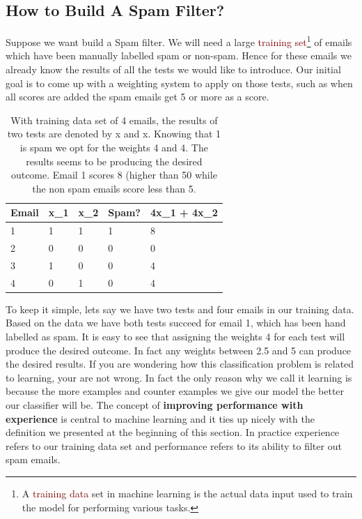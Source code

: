 \documentclass{tufte-handout}
\newcommand{\hlred}[1]{\textcolor{Maroon}{#1}}%
\begin{document}
\subsection{How to Build A Spam Filter?}
Suppose we want build a Spam filter. We will need a large \hlred{training set}\footnote{A \hlred{training data} set in machine learning is the actual data input used to train the model for performing various tasks. } of emails which have been manually labelled spam or non-spam. Hence for these emails we already know the results of all the tests we would like to introduce. Our initial goal  is to come up with a weighting system to apply on those tests, such as when all scores are added the spam emails get 5 or more as a score. 
\begin{table}[ht]
  \centering
  \selectfont
  \begin{tabular}{lllll}
    \toprule
    Email & x_{1} & x_{2} & Spam? & 4x_{1} + 4x_{2}\\
    \midrule
    1 & 1 & 1 & 1 & 8 \\
    2 & 0 & 0 & 0 & 0 \\
    3 & 1 & 0 & 0 & 4 \\
    4 & 0 & 1 & 0 & 4 \\

    \bottomrule
  \end{tabular}
  
  \caption{With training data set of 4 emails, the results of two tests are denoted by x and x. Knowing that 1 is spam we opt for the weights 4 and 4. The results seems to be producing the desired outcome. Email 1 scores 8 (higher than 50 while the non spam emails score less than 5.}
  \label{tab:normaltab}
\end{table}
To keep it simple, lets say we have two tests and four emails in our training data. Based on the data we have both tests succeed for email 1, which has been hand labelled as spam. It is easy to see that assigning the weights 4 for each test will produce the desired outcome. In fact any weights between 2.5 and 5 can produce the desired results. 
If you are wondering how this classification problem is related to learning, your are not wrong. In fact the only reason why we call it learning is because the more examples and counter examples we give our model the better our classifier will be. The concept of \textbf{improving performance with experience} is central to machine learning and it ties up nicely with the definition we presented at the beginning of this section. In practice experience refers to our training data set and performance refers to its ability to filter out spam emails.
\end{document}
